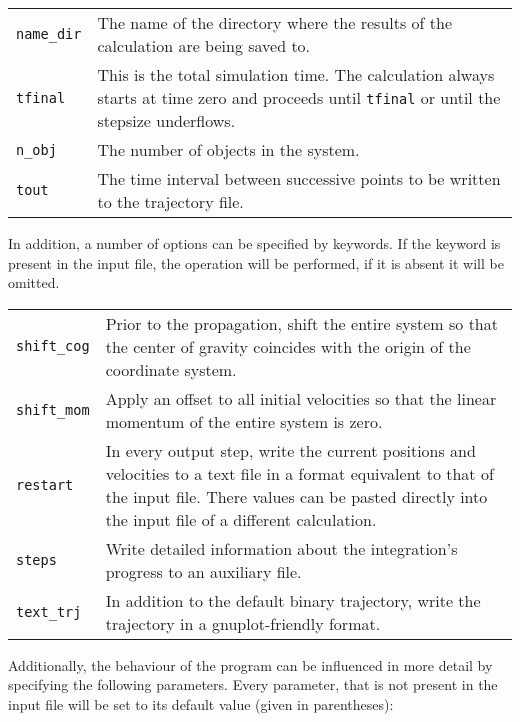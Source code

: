 \documentclass[paper=a4,pagesize,DIV=12,BCOR=12mm]{scrbook}
\begin{document}
\begin{tabular}{p{}p{}}
    \verb+name_dir+ & The name of the directory where the results of the calculation are being saved to. \\
    \verb+tfinal+   & This is the total simulation time. The calculation always starts at time zero and
                      proceeds until \verb+tfinal+ or until the stepsize underflows.                     \\
    \verb+n_obj+    & The number of objects in the system.                                               \\
    \verb+tout+     & The time interval between successive points to be written to the trajectory file.  \\
\end{tabular}

In addition, a number of options can be specified by keywords. If the keyword is present in the input
file, the operation will be performed, if it is absent it will be omitted.

\begin{tabular}{p{}p{}}
    \verb+shift_cog+    & Prior to the propagation, shift the entire system so that the center of gravity
                          coincides with the origin of the coordinate system. \\
    \verb+shift_mom+    & Apply an offset to all initial velocities so that the linear momentum of the
                          entire system is zero. \\
    \verb+restart+      & In every output step, write the current positions and velocities to a text
                          file in a format equivalent to that of the input file. There values can be
                          pasted directly into the input file of a different calculation. \\
    \verb+steps+        & Write detailed information about the integration's progress to an auxiliary
                          file. \\
    \verb+text_trj+     & In addition to the default binary trajectory, write the trajectory in a
                          gnuplot-friendly format. \\
\end{tabular}

Additionally, the behaviour of the program can be influenced in more detail by specifying the following
parameters. Every parameter, that is not present in the input file will be set to its default value
(given in parentheses):
\end{document}
